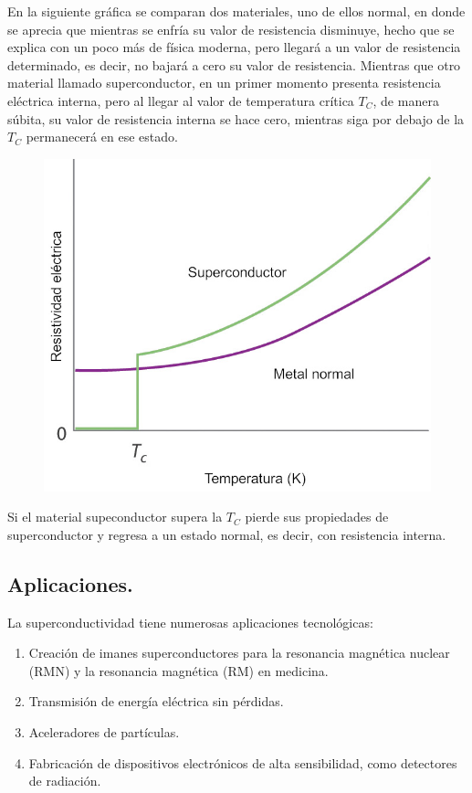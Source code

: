 \documentclass[12pt]{article}
\begin{document}
En la siguiente gráfica se comparan dos materiales, uno de ellos normal, en donde se aprecia que mientras se enfría su valor de resistencia disminuye, hecho que se explica con un poco más de física moderna, pero llegará a un valor de resistencia determinado, es decir, no bajará a cero su valor de resistencia. Mientras que otro material llamado superconductor, en un primer momento presenta resistencia eléctrica interna, pero al llegar al valor de temperatura crítica $T_{C}$, de manera súbita, su valor de resistencia interna se hace cero, mientras siga por debajo de la $T_{C}$ permanecerá en ese estado.
\begin{figure}[H]
    \centering
    \includegraphics[scale=1.5]{Imagenes/Superconductividad_01.jpg}
\end{figure}
Si el material supeconductor supera la $T_{C}$ pierde sus propiedades de superconductor y regresa a un estado normal, es decir, con resistencia interna. 

\subsection{Aplicaciones.}

La superconductividad tiene numerosas aplicaciones tecnológicas:

\begin{enumerate}
\item Creación de imanes superconductores para la resonancia magnética nuclear (RMN) y la resonancia magnética (RM) en medicina.
\item Transmisión de energía eléctrica sin pérdidas.
\item Aceleradores de partículas.
\item Fabricación de dispositivos electrónicos de alta sensibilidad, como detectores de radiación.
\end{enumerate}
\end{document}
